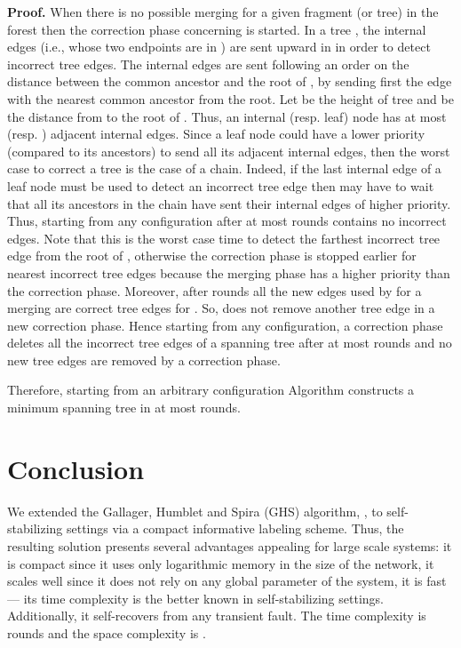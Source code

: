 \documentclass[11pt,a4paper]{article}
\newenvironment{proof}{\noindent \begin{rm}{\textbf{Proof.} }}{\hspace*{\fill}\par\end{rm}}
\begin{document}
\begin{proof}
When there is no possible merging for a given fragment (or tree)  in the forest then the correction phase concerning  is started. In a tree , the internal edges (i.e., whose two endpoints are in ) are sent upward in  in order to detect incorrect tree edges. The internal edges  are sent following an order on the distance between the common ancestor  and the root of , by sending first the edge  with the nearest common ancestor  from the root. Let  be the height of tree  and  be the distance from  to the root of . Thus, an internal (resp. leaf) node has at most  (resp. ) adjacent internal edges. Since a leaf node could have a lower priority (compared to its ancestors) to send all its adjacent internal edges, then the worst case to correct a tree is the case of a chain. Indeed, if the last internal edge of a leaf node  must be used to detect an incorrect tree edge then  may have to wait that all its ancestors in the chain have sent their internal edges of higher priority. Thus, starting from any configuration after at most  rounds  contains no incorrect edges. Note that this is the worst case time to detect the farthest incorrect tree edge from the root of , otherwise the correction phase is stopped earlier for nearest incorrect tree edges because the merging phase has a higher priority than the correction phase. Moreover, after  rounds all the new edges used by  for a merging are correct tree edges for . So,  does not remove another tree edge in a new correction phase. Hence starting from any configuration, a correction phase deletes all the incorrect tree edges of a spanning tree after at most  rounds and no new tree edges are removed by a correction phase.

Therefore, starting from an arbitrary configuration Algorithm  constructs a minimum spanning tree in at most  rounds.
\end{proof}

\section{Conclusion}
We extended the Gallager, Humblet and Spira (GHS) algorithm, 
\cite{GallagerHS83}, 
to self-stabilizing settings via a compact informative labeling scheme.
Thus, the resulting solution presents several advantages 
appealing for large scale systems: it is compact since it 
uses only logarithmic memory in the size of the network, 
it scales well since it does not rely on any global 
parameter of the system, it is fast --- its time complexity is the 
better known in self-stabilizing settings. Additionally, it self-recovers 
from any transient fault. The time complexity is 
rounds and the space complexity is .
\end{document}
